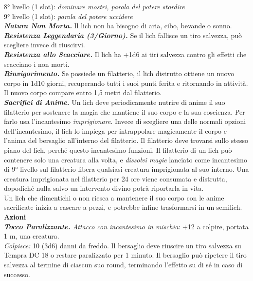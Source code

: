 \begin{multicols}{2}
8° livello (1 slot): \emph{dominare mostri, parola del potere stordire}\\
9° livello (1 slot): \emph{parola del potere uccidere}\\
\emph{\textbf{Natura Non Morta.}} Il lich non ha bisogno di aria, cibo, bevande o sonno.\\
\emph{\textbf{Resistenza Leggendaria (3/Giorno).}} Se il lich fallisce un tiro salvezza, può scegliere invece di riuscirvi.\\
\emph{\textbf{Resistenza allo Scacciare.}} Il lich ha +1d6 ai tiri salvezza contro gli effetti che scacciano i non morti.\\
\emph{\textbf{Rinvigorimento.}} Se possiede un filatterio, il lich distrutto ottiene un nuovo corpo in 1d10 giorni, recuperando tutti i suoi punti ferita e ritornando in attività. Il nuovo corpo compare entro 1,5 metri dal filatterio.\\

\emph{\textbf{Sacrifici di Anime.}} Un lich deve periodicamente nutrire di anime il suo filatterio per sostenere la magia che mantiene il suo corpo e la sua coscienza. Per farlo usa l'incantesimo \emph{imprigionare}. Invece di scegliere una delle normali opzioni dell'incantesimo, il lich lo impiega per intrappolare magicamente il corpo e l'anima del bersaglio all'interno del filatterio. Il filatterio deve trovarsi sullo stesso piano del lich, perché questo incantesimo funzioni. Il filatterio di un lich può contenere solo una creatura alla volta, e \emph{dissolvi magie} lanciato come incantesimo di 9° livello sul filatterio libera qualsiasi creatura imprigionata al suo interno. Una creatura imprigionata nel filatterio per 24 ore viene consumata e distrutta, dopodiché nulla salvo un intervento divino potrà riportarla in vita.\\
Un lich che dimentichi o non riesca a mantenere il suo corpo con le anime sacrificate inizia a cascare a pezzi, e potrebbe infine trasformarsi in un semilich.\\

\smallskip\textbf{Azioni}\\

\emph{\textbf{Tocco Paralizzante.} Attacco con incantesimo in mischia}: +12 a colpire, portata 1 m, una creatura.\\

\emph{Colpisce:} 10 (3d6) danni da freddo. Il bersaglio deve riuscire un tiro salvezza su Tempra DC 18 o restare paralizzato per 1 minuto. Il bersaglio può ripetere il tiro salvezza al termine di ciascun suo round, terminando l'effetto su di sé in caso di successo.\\


\end{multicols}
